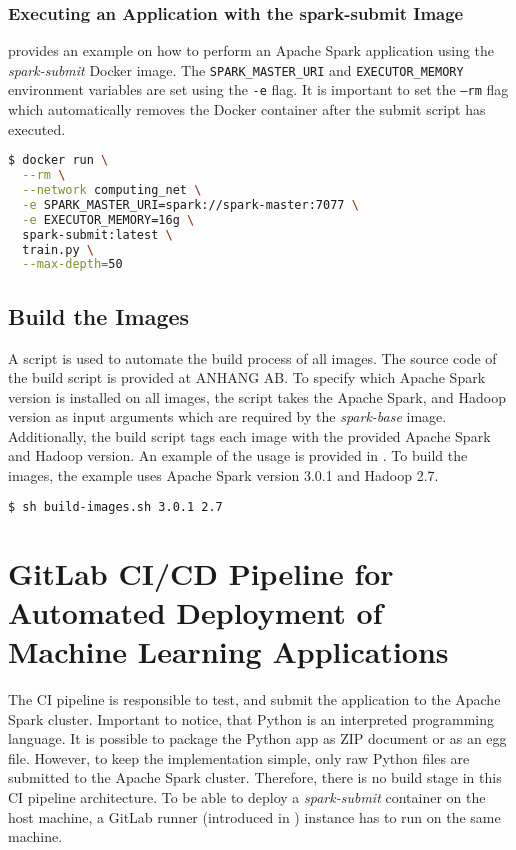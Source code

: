 \subsubsection{Executing an Application with the spark-submit Image}
% 
 provides an example on how to perform an Apache Spark application using the \textit{spark-submit} Docker image.
The \texttt{SPARK\_MASTER\_URI} and \texttt{EXECUTOR\_MEMORY} environment variables are set using the \texttt{-e} flag.
%
It is important to set the \texttt{--rm} flag which automatically removes the Docker container after the submit script has executed.
\begin{lstlisting}[label=lst:06_env_depl_submit_example, caption=Example of the spark-submit image, language=bash, numbers=none]
$ docker run \
  --rm \
  --network computing_net \
  -e SPARK_MASTER_URI=spark://spark-master:7077 \
  -e EXECUTOR_MEMORY=16g \
  spark-submit:latest \
  train.py \
  --max-depth=50
\end{lstlisting}


\subsection{Build the Images}
A script is used to automate the build process of all images.
The source code of the build script is provided at ANHANG AB.
To specify which Apache Spark version is installed on all images, the script takes the Apache Spark, and Hadoop version as input arguments which are required by the \textit{spark-base} image.
Additionally, the build script tags each image with the provided Apache Spark and Hadoop version.
An example of the usage is provided in .
To build the images, the example uses Apache Spark version 3.0.1 and Hadoop 2.7.
\begin{lstlisting}[label=lst:06_env_depl_build_example, caption=Example of the spark-submit image, language=bash, numbers=none]
$ sh build-images.sh 3.0.1 2.7
\end{lstlisting}


\section{GitLab CI/CD Pipeline for Automated Deployment of Machine Learning Applications}
%
The CI pipeline is responsible to test, and submit the application to the Apache Spark cluster.
%
Important to notice, that Python is an interpreted programming language. It is possible to package the Python app as ZIP document or as an egg file. However, to keep the implementation simple, only raw Python files are submitted to the Apache Spark cluster. Therefore, there is no build stage in this CI pipeline architecture.
%
To be able to deploy a \textit{spark-submit} container on the host machine, a GitLab runner (introduced in ) instance has to run on the same machine.


